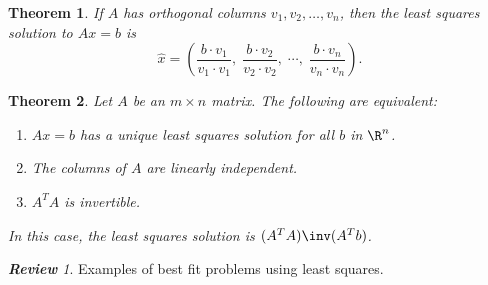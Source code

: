 \documentclass[12pt]{amsart}
\theoremstyle{plain}
\newtheorem*{Thm}{Theorem}
\theoremstyle{remark}
\newtheorem*{Rev}{\bf Review}
\begin{document}
\begin{Thm}
  If $A$ has orthogonal columns $v_1,v_2,\ldots,v_n$, then the least squares
  solution to $Ax=b$ is
  \[ \displaystyle\hat x = \left(
    \frac{b\cdot v_1}{v_1\cdot v_1},\;
    \frac{b\cdot v_2}{v_2\cdot v_2},\;
    \cdots,\;
    \frac{b\cdot v_n}{v_n\cdot v_n}
  \right). \]
\end{Thm}

\begin{Thm}
  Let $A$ be an $m\times n$ matrix.  The following are equivalent:
  \begin{enumerate}
  \item $Ax=b$ has a \emph{unique} least squares solution for all $b$ in $\R^n$.
  \item The columns of $A$ are linearly independent.
  \item $A^TA$ is invertible.
  \end{enumerate}
  In this case, the least squares solution is $(A^T A)\inv(A^T b)$.
\end{Thm}

\begin{Rev}
  Examples of best fit problems using least squares.
\end{Rev}
\end{document}
